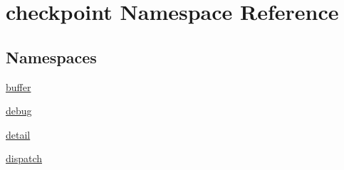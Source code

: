 \hypertarget{namespacecheckpoint}{}\section{checkpoint Namespace Reference}
\label{namespacecheckpoint}
\subsection*{Namespaces}
\begin{DoxyCompactItemize}
\item 
 \hyperlink{namespacecheckpoint_1_1buffer}{buffer}
\item 
 \hyperlink{namespacecheckpoint_1_1debug}{debug}
\item 
 \hyperlink{namespacecheckpoint_1_1detail}{detail}
\item 
 \hyperlink{namespacecheckpoint_1_1dispatch}{dispatch}
\end{DoxyCompactItemize}
